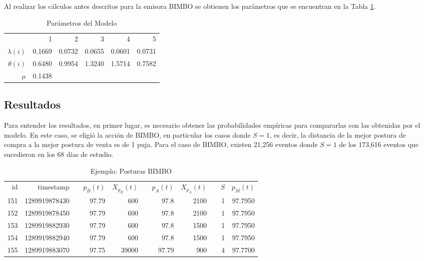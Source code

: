 \documentclass[11pt]{article}
\numberwithin{equation}{section} %
\begin{document}
Al realizar los cálculos antes descritos para la emisora BIMBO se obtienen los parámetros que se encuentran en la Tabla \ref{tab:paremeters}.

\begin{table}[htbp]
\centering
\caption{Parámetros del Modelo}
\begin{tabular}{r|r|r|r|r|r|}
\cline{2-6}
& 1& 2 & 3 & 4 & 5 \\
\cline{2-6}
$\lambda(i)$ & 0.1669 & 0.0732 & 0.0655 & 0.0601 & 0.0731 \\
$\theta(i)$ & 0.6480 & 0.9954 & 1.3240 & 1.5714 & 0.7582 \\
\cline{2-6}
$\mu$ & 0.1438 & & & & \\
\cline{2-6}
\end{tabular}%
\label{tab:paremeters}%
\end{table}%

\clearpage

\subsection{Resultados}

Para entender los resultados, en primer lugar, es necesario obtener las probabilidades empíricas para compararlas con las obtenidas por el modelo. En este caso, se eligió la acción de BIMBO, en particular los casos donde $S=1$, es decir, la distancia de la mejor postura de compra a la mejor postura de venta es de 1 puja. Para el caso de BIMBO, existen 21,256 eventos donde $S=1$ de los 173,616 eventos que sucedieron en los 68 días de estudio.

\begin{table}[htbp]
  \centering
  \caption{Ejemplo: Posturas BIMBO}
    \begin{tabular}{rrrrrrrrrrr}
    id    & timestamp &       & $p_B(t)$    & $X_{p_B}(t)$ &       & $p_A(t)$    & $X_{p_A}(t)$   &       & $S$     & $p_M(t)$ \\
    151   & 1289919878430 &       & 97.79 & 600   &       & 97.8  & 2100  &       & 1  & 97.7950 \\
    152   & 1289919878450 &       & 97.79 & 600   &       & 97.8  & 2100  &       & 1  & 97.7950 \\
    153   & 1289919882930 &       & 97.79 & 600   &       & 97.8  & 1500  &       & 1  & 97.7950 \\
    154   & 1289919882940 &       & 97.79 & 600   &       & 97.8  & 1500  &       & 1  & 97.7950 \\
    155   & 1289919883070 &       & 97.75 & 39000 &       & 97.79 & 900   &       & 4  & 97.7700 \\
    \end{tabular}%
  \label{tab:bimbotab}%
\end{table}%
\end{document}
